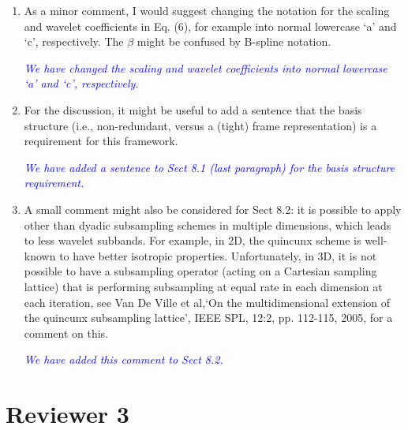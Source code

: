 \documentclass{article}
\newcommand{\parham}[1]{\textcolor{blue}{#1}}
\begin{document}
\begin{enumerate}
    \item As a minor comment, I would suggest changing the notation for the scaling and wavelet coefficients in Eq. (6), for example into normal lowercase `a' and `c', respectively. The $\beta$ might be confused by B-spline notation. 

	\emph{\parham{We have changed the scaling and wavelet coefficients into normal lowercase `a' and `c', respectively.}}

\item For the discussion, it might be useful to add a sentence that the basis structure (i.e., non-redundant, versus a (tight) frame representation) is a requirement for this framework.

\emph{\parham{We have added a sentence to Sect 8.1 (last paragraph) for the basis structure requirement.}}



\item A small comment might also be considered for Sect 8.2: it is possible to apply other than dyadic subsampling schemes in multiple dimensions, which leads to less wavelet subbands. For example, in 2D, the quincunx scheme is well-known to have better isotropic properties. Unfortunately, in 3D, it is not possible to have a subsampling operator (acting on a Cartesian sampling lattice) that is performing subsampling at equal rate in each dimension at each iteration, see Van De Ville et al,`On the multidimensional extension of the quincunx subsampling lattice', IEEE SPL, 12:2, pp.  112-115, 2005, for a comment on this. 

\emph{\parham{We have added this comment to Sect 8.2.}}



 

\end{enumerate}  

    \section{Reviewer 3}  
\end{document}
